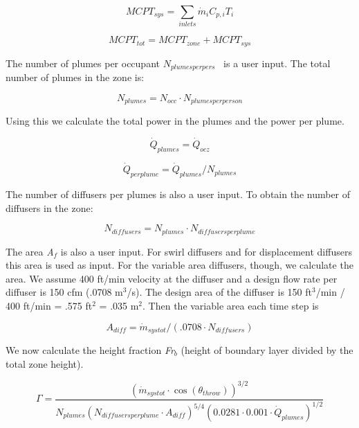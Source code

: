 \begin{equation}
MCP{T_{sys}} = \sum\limits_{inlets} {{{\dot m}_i}} {C_{p,i}}{T_i}
\end{equation}

\begin{equation}
MCP{T_{tot}} = MCP{T_{zone}} + MCP{T_{sys}}
\end{equation}

The number of plumes per occupant \({N_{plumesperpers}}\) ~is a user input. The total number of plumes in the zone is:

\begin{equation}
{N_{plumes}} = {N_{occ}} \cdot {N_{plumesperperson}}
\end{equation}

Using this we calculate the total power in the plumes and the power per plume.

\begin{equation}
{\dot Q_{plumes}} = {\dot Q_{ocz}}
\end{equation}

\begin{equation}
{\dot Q_{perplume}} = {\dot Q_{plumes}}/{N_{plumes}}
\end{equation}

The number of diffusers per plumes is also a user input. To obtain the number of diffusers in the zone:

\begin{equation}
{N_{diffusers}} = {N_{plumes}}\cdot {N_{diffusersperplume}}
\end{equation}

The area \emph{A\(_{f}\)} is also a user input. For swirl diffusers and for displacement diffusers this area is used as input. For the variable area diffusers, though, we calculate the area. We assume 400 ft/min velocity at the diffuser and a design flow rate per diffuser is 150 cfm (.0708 m\(^{3}\)/s). The design area of the diffuser is 150 ft\(^{3}\)/min /~ 400 ft/min = .575 ft\(^{2}\) = .035 m\(^{2}\). Then the variable area each time step is

\begin{equation}
{A_{diff}} = {\dot m_{systot}}/(.0708\cdot {N_{diffusers}})
\end{equation}

We now calculate the height fraction \emph{Fr\(_{b}\)} (height of boundary layer divided by the total zone height).

\begin{equation}
\Gamma  = \frac{{{{({{\dot m}_{systot}}\cdot \cos ({\theta_{throw}}))}^{3/2}}}}{{{N_{plumes}}{{({N_{diffusersperplume}}\cdot {A_{diff}})}^{5/4}}{{(0.0281\cdot 0.001\cdot {{\dot Q}_{plumes}})}^{1/2}}}}
\end{equation}

